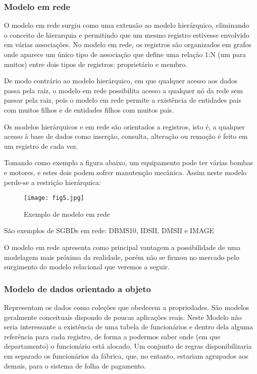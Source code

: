 \documentclass{article}
\begin{document}
\subsubsection{Modelo em rede}
O modelo em rede surgiu como uma extensão ao modelo hierárquico, eliminando o conceito de hierarquia e permitindo que um mesmo registro estivesse envolvido em várias associações. No modelo em rede, os registros são organizados em grafos onde aparece um único tipo de associação que define uma relação 1:N (um para muitos) entre dois tipos de registros: proprietário e membro.

De modo contrário ao modelo hierárquico, em que qualquer acesso aos dados passa pela raiz, o modelo em rede possibilita acesso a qualquer nó da rede sem passar pela raiz, pois o modelo em rede permite a existência de entidades pais com muitos filhos e de entidades filhos com muitos pais.

Os modelos hierárquicos e em rede são orientados a registros, isto é, a qualquer acesso à base de dados como inserção, consulta, alteração ou remoção é feito em um registro de cada vez.

Tomando como exemplo a figura abaixo, um equipamento pode ter várias bombas e motores, e estes dois podem sofrer manutenção mecânica. Assim neste modelo perde-se a restrição hierárquica:

\begin{figure}[h]
    \centering
    \texttt{[image: fig5.jpg]}
    \caption{Exemplo de modelo em rede}
    \label{fig:fig5}
\end{figure}
São exemplos de SGBDs em rede: DBMS10, IDSII, DMSII e IMAGE

O modelo em rede apresenta como principal vantagem a possibilidade de uma modelagem mais próxima da realidade, porém não se firmou no mercado pelo surgimento do modelo relacional que veremos a seguir.

\subsubsection{Modelo de dados orientado a objeto}
Representam os dados como coleções que obedecem a propriedades. São modelos geralmente conceituais dispondo de poucas aplicações reais. Neste Modelo não seria interessante a existência de uma tabela de funcionários e dentro dela alguma referência para cada registro, de forma a podermos saber onde (em que departamento) o funcionário está alocado. Um conjunto de regras disponibilizaria em separado os funcionários da fábrica, que, no entanto, estariam agrupados aos demais, para o sistema de folha de pagamento.
\end{document}
